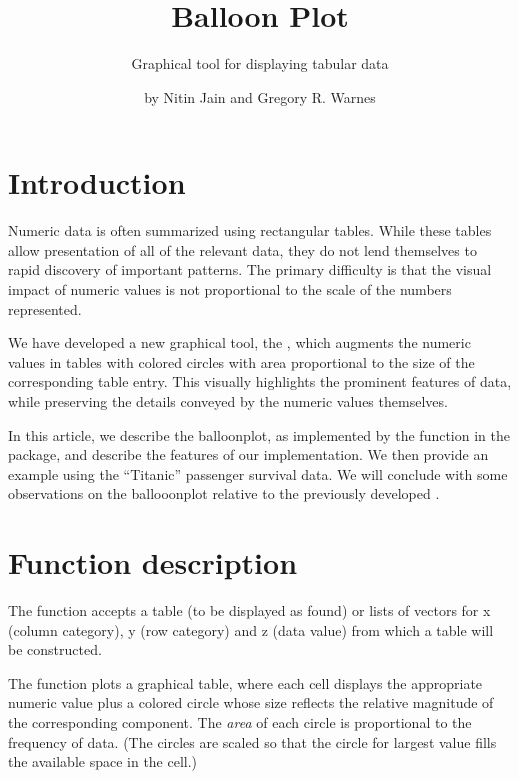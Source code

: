 \documentclass[a4paper]{report}
\begin{document}
\begin{article}
\author{by Nitin Jain and Gregory R. Warnes}
\title{Balloon Plot}
\subtitle{Graphical tool for displaying tabular data}

\maketitle

\section*{Introduction}

Numeric data is often summarized using rectangular tables. While
these tables allow presentation of all of the relevant data, they do
not lend themselves to rapid discovery of important patterns. The
primary difficulty is that the visual impact of numeric values is
not proportional to the scale of the numbers represented.

We have developed a new graphical tool, the ,
which augments the numeric values in tables with colored circles
with area proportional to the size of the corresponding table
entry. This visually highlights the prominent features of
data, while preserving the details conveyed by the numeric values
themselves.

In this article, we describe the balloonplot, as implemented by the
 function in the  package, and
describe the features of our implementation.  We then provide an
example using the ``Titanic'' passenger survival data.  We will
conclude with some observations on the ballooonplot relative to the
previously developed .

\section*{Function description}

The  function accepts a table (to be displayed as
found) or lists of vectors for x (column category), y (row category)
and z (data value) from which a table will be constructed.

The  function plots a graphical table,
where each cell displays the appropriate numeric value plus a
colored circle whose size reflects the relative magnitude of the
corresponding component. The
\emph{area} of each circle is proportional to the frequency of
data. (The circles are scaled so that the circle for largest value
fills the available space in the cell.)



\end{article}
\end{document}
